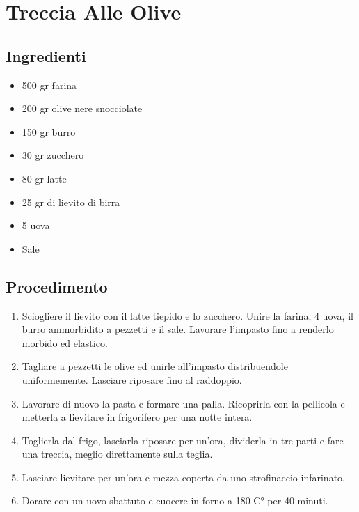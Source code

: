 \section{Treccia Alle Olive}
\subsection{Ingredienti}
\begin{itemize}
\item 500 gr farina   
\item 200 gr olive nere snocciolate  
\item 150 gr burro  
\item 30 gr zucchero  
\item 80 gr latte  
\item 25 gr di lievito di birra   
\item 5 uova  
\item Sale
\end{itemize}
\subsection{Procedimento}
\begin{enumerate}
\item  Sciogliere il lievito con il latte tiepido e lo zucchero. Unire la farina, 4 uova, il burro ammorbidito a pezzetti e il sale. Lavorare l'impasto fino a renderlo morbido ed elastico.  
\item  Tagliare a pezzetti le olive ed unirle all'impasto distribuendole uniformemente. Lasciare riposare fino al raddoppio.  
\item  Lavorare di nuovo la pasta e formare una palla. Ricoprirla con la pellicola e metterla a lievitare in frigorifero per una notte intera.  
\item  Toglierla dal frigo, lasciarla riposare per un'ora, dividerla in tre parti e fare una treccia, meglio direttamente sulla teglia.   
\item  Lasciare lievitare per un'ora e mezza coperta da uno strofinaccio infarinato.   
\item  Dorare con un uovo sbattuto e cuocere in forno a 180 C° per 40 minuti.
\end{enumerate}
